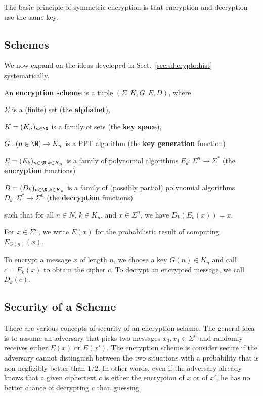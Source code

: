 The basic principle of symmetric encryption is that encryption and decryption use the same key.

\subsection{Schemes}

We now expand on the ideas developed in Sect.~\ref{sec:sd:crypto:hist} systematically.

\begin{definition}
 An \textbf{encryption scheme} is a tuple $(\Sigma,K,G, E, D)$, where
  \begin{compactitem}
   \item $\Sigma$ is a (finite) set (the \textbf{alphabet}),
   \item $K=(K_n)_{n\in \N}$ is a family of sets (the \textbf{key space}),
   \item $G:(n\in \N)\to K_n$ is a PPT algorithm (the \textbf{key generation} function)
   \item $E=(E_k)_{n\in\N,k\in K_n}$ is a family of polynomial algorithms $E_k:\Sigma^n\to\Sigma^*$ (the \textbf{encryption} functions)
   \item $D=(D_k)_{n\in\N,k\in K_n}$ is a family of (possibly partial) polynomial algorithms $D_k:\Sigma^*\to\Sigma^n$ (the \textbf{decryption} functions)
  \end{compactitem}
  such that for all $n\in N$, $k\in K_n$, and $x\in \Sigma^n$, we have $D_k(E_k(x))=x$.

  For $x\in\Sigma^n$, we write $E(x)$ for the probabilistic result of computing $E_{G(n)}(x)$.
\end{definition}

To encrypt a message $x$ of length $n$, we choose a key $G(n)\in K_n$ and call $c=E_k(x)$ to obtain the cipher $c$.
To decrypt an encrypted message, we call $D_k(c)$.

\subsection{Security of a Scheme}

There are various concepts of security of an encryption scheme.
The general idea is to assume an adversary that picks two messages $x_0,x_1\in\Sigma^n$ and randomly receives either $E(x)$ or $E(x')$.
The encryption scheme is consider secure if the adversary cannot distinguish between the two situations with a probability that is non-negligibly better than $1/2$.
In other words, even if the adversary already knows that a given ciphertext $c$ is either the encryption of $x$ or of $x'$, he has no better chance of decrypting $c$ than guessing.

